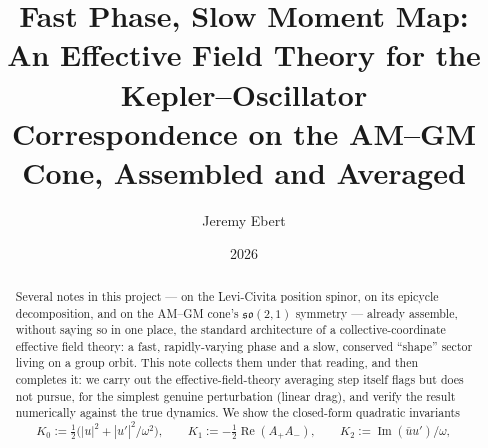 \documentclass[11pt]{amsart}
\title[Fast Phase, Slow Moment Map]{Fast Phase, Slow Moment Map:\\
An Effective Field Theory for the Kepler--Oscillator\\
Correspondence on the AM--GM Cone, Assembled and Averaged}
\author{Jeremy Ebert}
\date{2026}
\theoremstyle{remark}
\begin{document}
\maketitle

\begin{abstract}
Several notes in this project --- \cite{Ebert2026LeviCivita} on the Levi-Civita position spinor, \cite{Ebert2026Epicycle} on its epicycle decomposition, and \cite{Ebert2026Cone} on the AM--GM cone's $\mathfrak{so}(2,1)$ symmetry --- already assemble, without saying so in one place, the standard architecture of a collective-coordinate effective field theory: a fast, rapidly-varying phase and a slow, conserved ``shape'' sector living on a group orbit. This note collects them under that reading, and then completes it: we carry out the effective-field-theory averaging step \cite{Ebert2026Cone} itself flags but does not pursue, for the simplest genuine perturbation (linear drag), and verify the result numerically against the true dynamics. We show the closed-form quadratic invariants
\[
K_0:=\tfrac12\Big(|u|^2+|u'|^2/\omega^2\Big),\qquad K_1:=-\tfrac12\operatorname{Re}(A_+A_-),\qquad K_2:=\operatorname{Im}(\bar uu')/\omega,
\]

\end{abstract}
\end{document}
